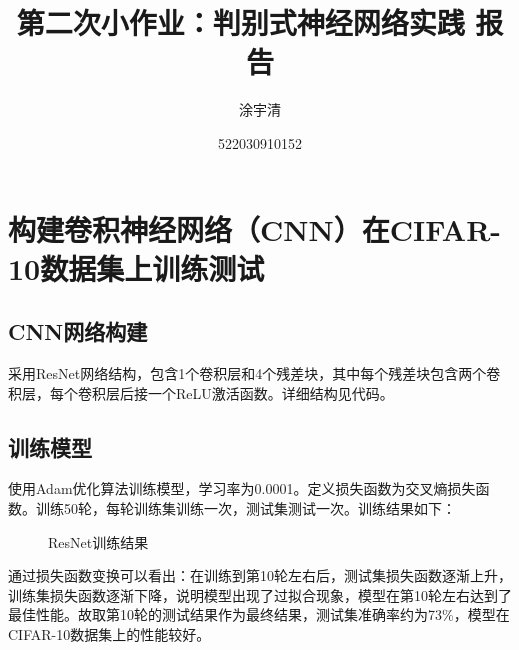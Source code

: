 \documentclass[UTF8,a4paper,12pt]{ctexart}
\title{\textbf{\Large{第二次小作业：判别式神经网络实践 报告}}}
\author{涂宇清}
\date{522030910152}
\begin{document}
 
\maketitle
\setcounter{page}{1}        %
 
 
\section{构建卷积神经网络（CNN）在CIFAR-10数据集上训练测试}

\subsection{CNN网络构建}
采用ResNet网络结构，包含1个卷积层和4个残差块，其中每个残差块包含两个卷积层，每个卷积层后接一个ReLU激活函数。详细结构见代码。

\subsection{训练模型}
使用Adam优化算法训练模型，学习率为0.0001。定义损失函数为交叉熵损失函数。训练50轮，每轮训练集训练一次，测试集测试一次。训练结果如下：

\begin{figure}[H]
    \centering
    \caption{ResNet训练结果}
\end{figure}
 
通过损失函数变换可以看出：在训练到第10轮左右后，测试集损失函数逐渐上升，训练集损失函数逐渐下降，说明模型出现了过拟合现象，模型在第10轮左右达到了最佳性能。故取第10轮的测试结果作为最终结果，测试集准确率约为73\%，模型在CIFAR-10数据集上的性能较好。
\end{document}
